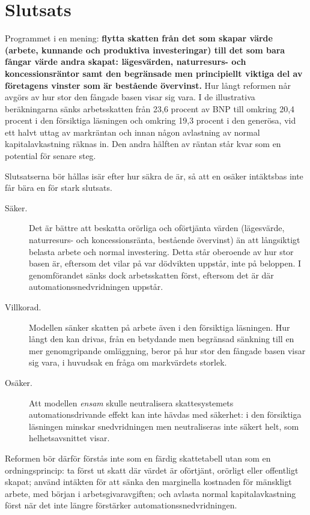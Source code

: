 \documentclass[11pt]{article}
\begin{document}
\section{Slutsats}

Programmet i en mening: \textbf{flytta skatten från det som skapar värde (arbete, kunnande och produktiva investeringar) till det som bara fångar värde andra skapat: lägesvärden, naturresurs- och koncessionsräntor samt den begränsade men principiellt viktiga del av företagens vinster som är bestående övervinst.} Hur långt reformen når avgörs av hur stor den fångade basen visar sig vara. I de illustrativa beräkningarna sänks arbetsskatten från 23,6 procent av BNP till omkring 20,4 procent i den försiktiga läsningen och omkring 19,3 procent i den generösa, vid ett halvt uttag av markräntan och innan någon avlastning av normal kapitalavkastning räknas in. Den andra hälften av räntan står kvar som en potential för senare steg.

Slutsatserna bör hållas isär efter hur säkra de är, så att en osäker intäktsbas inte får bära en för stark slutsats.

\begin{description}
\item[Säker.] Det är bättre att beskatta orörliga och oförtjänta värden (lägesvärde, naturresurs- och koncessionsränta, bestående övervinst) än att långsiktigt belasta arbete och normal investering. Detta står oberoende av hur stor basen är, eftersom det vilar på var dödvikten uppstår, inte på beloppen. I genomförandet sänks dock arbetsskatten först, eftersom det är där automationssnedvridningen uppstår.
\item[Villkorad.] Modellen sänker skatten på arbete även i den försiktiga läsningen. Hur långt den kan drivas, från en betydande men begränsad sänkning till en mer genomgripande omläggning, beror på hur stor den fångade basen visar sig vara, i huvudsak en fråga om markvärdets storlek.
\item[Osäker.] Att modellen \emph{ensam} skulle neutralisera skattesystemets automationsdrivande effekt kan inte hävdas med säkerhet: i den försiktiga läsningen minskar snedvridningen men neutraliseras inte säkert helt, som helhetsavsnittet visar.
\end{description}

Reformen bör därför förstås inte som en färdig skattetabell utan som en ordningsprincip: ta först ut skatt där värdet är oförtjänt, orörligt eller offentligt skapat; använd intäkten för att sänka den marginella kostnaden för mänskligt arbete, med början i arbetsgivaravgiften; och avlasta normal kapitalavkastning först när det inte längre förstärker automationssnedvridningen.
\end{document}
